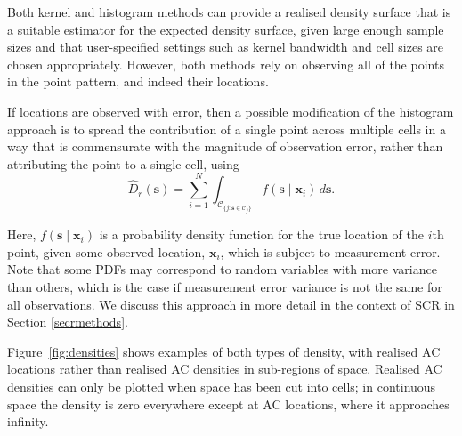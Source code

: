 \documentclass[useAMS,usenatbib,referee]{biom}
\begin{document}
Both kernel and histogram methods can provide a realised density surface that is a suitable estimator for the expected density surface, given large enough sample sizes and that user-specified settings such as kernel bandwidth and cell sizes are chosen appropriately. However, both methods rely on observing all of the points in the point pattern, and indeed their locations.

If locations are observed with error, then a possible modification of the histogram approach is to spread the contribution of a single point across multiple cells in a way that is commensurate with the magnitude of observation error, rather than attributing the point to a single cell, using
\begin{equation}
  \widehat{D}_r(\bm{s}) = \sum_{i = 1}^N \int_{\mathcal{C}_{\{j: \bm{s} \in \mathcal{C}_j\}}}  f(\bm{s} \mid \bm{x}_i) \, d\bm{s}. \label{eq:realised-D-error}
\end{equation}

Here, $f(\bm{s} \mid \bm{x}_i)$ is a probability density function for the true location of the $i$th point, given some observed location, $\bm{x}_i$, which is subject to measurement error. Note that some PDFs may correspond to random variables with more variance than others, which is the case if measurement error variance is not the same for all observations. We discuss this approach in more detail in the context of SCR in Section \ref{secrmethods}.

Figure~\ref{fig:densities} shows examples of both types of density, with realised AC locations rather than realised AC densities in sub-regions of space. Realised AC densities can only be plotted when space has been cut into cells; in continuous space the density is zero everywhere except at AC locations, where it approaches infinity.
\end{document}

